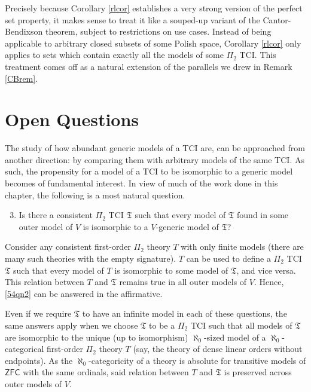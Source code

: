 \documentclass[12pt, twoside]{memoir}
\numberwithin{equation}{section}
\theoremstyle{definition}
\theoremstyle{remark}
\theoremstyle{definition}
\theoremstyle{definition}
\theoremstyle{definition}
\theoremstyle{remark}
\begin{document}
Precisely because Corollary \ref{rlcor} establishes a very strong version of the perfect set property, it makes sense to treat it like a souped-up variant of the Cantor-Bendixson theorem, subject to restrictions on use cases. Instead of being applicable to arbitrary closed subsets of some Polish space, Corollary \ref{rlcor} only applies to sets which contain exactly all the models of some $\Pi_2$ TCI. This treatment comes off as a natural extension of the parallels we drew in Remark \ref{CBrem}.

\section{Open Questions}

The study of how abundant generic models of a TCI are, can be approached from another direction: by comparing them with arbitrary models of the same TCI. As such, the propensity for a model of a TCI to be isomorphic to a generic model becomes of fundamental interest. In view of much of the work done in this chapter, the following is a most natural question.

\begin{enumerate}[label=(Q\arabic*)]
    \setcounter{enumi}{2}
    \item\label{54qn2} Is there a consistent $\Pi_2$ TCI $\mathfrak{T}$ such that every model of $\mathfrak{T}$ found in some outer model of $V$ is isomorphic to a $V$-generic model of $\mathfrak{T}$?
\end{enumerate}

Consider any consistent first-order $\Pi_2$ theory $T$ with only finite models (there are many such theories with the empty signature). $T$ can be used to define a $\Pi_2$ TCI $\mathfrak{T}$ such that every model of $T$ is isomorphic to some model of $\mathfrak{T}$, and vice versa. This relation between $T$ and $\mathfrak{T}$ remains true in all outer models of $V$. Hence, \ref{54qn2} can be answered in the affirmative. 

Even if we require $\mathfrak{T}$ to have an infinite model in each of these questions, the same answers apply when we choose $\mathfrak{T}$ to be a $\Pi_2$ TCI such that all models of $\mathfrak{T}$ are isomorphic to the unique (up to isomorphism) $\aleph_0$-sized model of a $\aleph_0$-categorical first-order $\Pi_2$ theory $T$ (say, the theory of dense linear orders without endpoints). As the $\aleph_0$-categoricity of a theory is absolute for transitive models of $\mathsf{ZFC}$ with the same ordinals, said relation between $T$ and $\mathfrak{T}$ is preserved across outer models of $V$.
\end{document}
